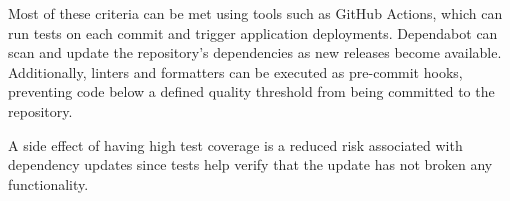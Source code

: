 Most of these criteria can be met using tools such as GitHub Actions, which can run tests on each commit and trigger application deployments. Dependabot can scan and update the repository’s dependencies as new releases become available. Additionally, linters and formatters can be executed as pre-commit hooks, preventing code below a defined quality threshold from being committed to the repository.

A side effect of having high test coverage is a reduced risk associated with dependency updates since tests help verify that the update has not broken any functionality.
